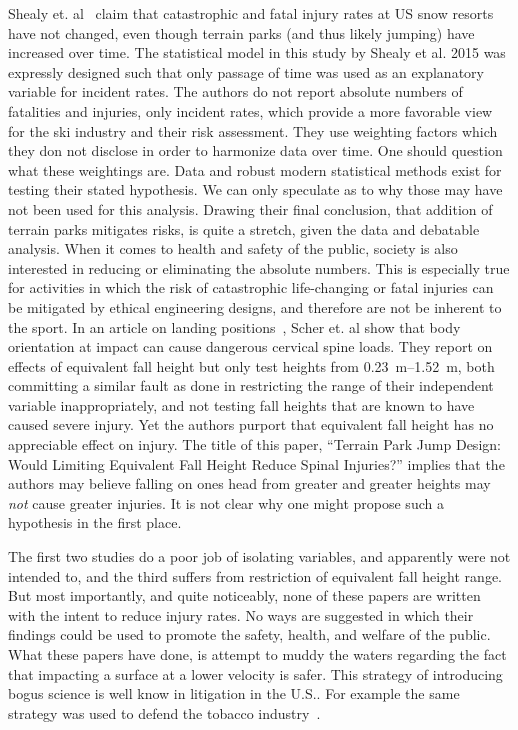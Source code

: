 \documentclass{article}
\begin{document}
Shealy et. al~\cite{Shealy2015} claim that catastrophic and fatal injury rates
at US snow resorts have not changed, even though terrain parks (and thus likely
jumping) have increased over time. The statistical model in this study by
Shealy et al. 2015 was expressly designed such that only passage of time was
used as an explanatory variable for incident rates. The authors do not report
absolute numbers of fatalities and injuries, only incident rates, which provide
a more favorable view for the ski industry and their risk assessment. They use
weighting factors which they don not disclose in order to harmonize data over
time. One should question what these weightings are.  Data and robust modern
statistical methods exist for testing their stated hypothesis. We can only
speculate as to why those may have not been used for this analysis. Drawing
their final conclusion, that addition of terrain parks mitigates risks, is
quite a stretch, given the data and debatable analysis. When it comes to health
and safety of the public, society is also interested in reducing or eliminating
the absolute numbers. This is especially true for activities in which the risk
of catastrophic life-changing or fatal injuries can be mitigated by ethical
engineering designs, and therefore are not be inherent to the sport.
%
In an article on landing positions~\cite{Scher2015}, Scher et. al show that
body orientation at impact can cause dangerous cervical spine loads. They
report on effects of equivalent fall height but only test heights from
\SIrange{0.23}{1.52}{\meter}, both committing a similar fault as done in
\cite{Shealy2010} restricting the range of their independent variable
inappropriately, and not testing fall heights that are known to have caused
severe injury. Yet the authors purport that equivalent fall height has no
appreciable effect on injury. The title of this paper, ``Terrain Park Jump
Design: Would Limiting Equivalent Fall Height Reduce Spinal Injuries?'' implies
that the authors may believe falling on ones head from greater and greater
heights may \emph{not} cause greater injuries. It is not clear why one might
propose such a hypothesis in the first place.

The first two studies do a poor job of isolating variables, and apparently were
not intended to, and the third suffers from restriction of equivalent fall
height range. But most importantly, and quite noticeably, none of these papers
are written with the intent to reduce injury rates. No ways are suggested in
which their findings could be used to promote the safety, health, and welfare
of the public. What these papers have done, is attempt to muddy the waters
regarding the fact that impacting a surface at a lower velocity is safer. This
strategy of introducing bogus science is well know in litigation in the U.S..
For example the same strategy was used to defend the tobacco industry~\cite{Oreskes2010}.
\end{document}
